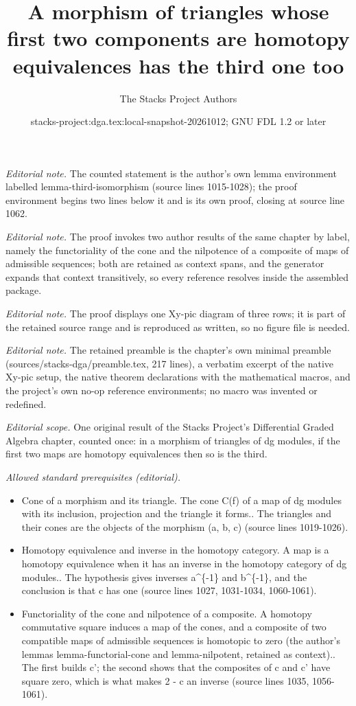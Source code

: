 \documentclass{stacks-project}
\title{A morphism of triangles whose first two components are homotopy equivalences has the third one too}
\author{The Stacks Project Authors}
\date{stacks-project:dga.tex:local-snapshot-20261012; GNU FDL 1.2 or later}
\theoremstyle{plain}
\theoremstyle{definition}
\theoremstyle{remark}
\numberwithin{equation}{subsection}
\begin{document}
\maketitle
\noindent\textit{Editorial note.} The counted statement is the author's own lemma environment labelled lemma-third-isomorphism (source lines 1015-1028); the proof environment begins two lines below it and is its own proof, closing at source line 1062.\par\medskip
\noindent\textit{Editorial note.} The proof invokes two author results of the same chapter by label, namely the functoriality of the cone and the nilpotence of a composite of maps of admissible sequences; both are retained as context spans, and the generator expands that context transitively, so every reference resolves inside the assembled package.\par\medskip
\noindent\textit{Editorial note.} The proof displays one Xy-pic diagram of three rows; it is part of the retained source range and is reproduced as written, so no figure file is needed.\par\medskip
\noindent\textit{Editorial note.} The retained preamble is the chapter's own minimal preamble (sources/stacks-dga/preamble.tex, 217 lines), a verbatim excerpt of the native Xy-pic setup, the native theorem declarations with the mathematical macros, and the project's own no-op reference environments; no macro was invented or redefined.\par\medskip
\noindent\textit{Editorial scope.} One original result of the Stacks Project's Differential Graded Algebra chapter, counted once: in a morphism of triangles of dg modules, if the first two maps are homotopy equivalences then so is the third.\par\medskip
\noindent\textit{Allowed standard prerequisites (editorial).}\begin{itemize}
\item Cone of a morphism and its triangle. The cone C(f) of a map of dg modules with its inclusion, projection and the triangle it forms.. The triangles and their cones are the objects of the morphism (a, b, c) (source lines 1019-1026).
\item Homotopy equivalence and inverse in the homotopy category. A map is a homotopy equivalence when it has an inverse in the homotopy category of dg modules.. The hypothesis gives inverses a\textasciicircum{}\{-1\} and b\textasciicircum{}\{-1\}, and the conclusion is that c has one (source lines 1027, 1031-1034, 1060-1061).
\item Functoriality of the cone and nilpotence of a composite. A homotopy commutative square induces a map of the cones, and a composite of two compatible maps of admissible sequences is homotopic to zero (the author's lemmas lemma-functorial-cone and lemma-nilpotent, retained as context).. The first builds c'; the second shows that the composites of c and c' have square zero, which is what makes 2 - c an inverse (source lines 1035, 1056-1061).
\end{itemize}\medskip
\end{document}
